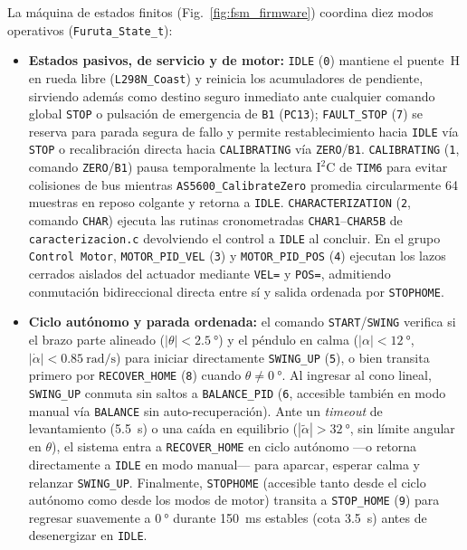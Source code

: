 La máquina de estados finitos (Fig.~\ref{fig:fsm_firmware}) coordina diez modos operativos (\texttt{Furuta\_State\_t}):
\begin{itemize}
    \item \textbf{Estados pasivos, de servicio y de motor:} \texttt{IDLE} (\texttt{0}) mantiene el puente~H en rueda libre (\texttt{L298N\_Coast}) y reinicia los acumuladores de pendiente, sirviendo además como destino seguro inmediato ante cualquier comando global \texttt{STOP} o pulsación de emergencia de \texttt{B1} (\texttt{PC13}); \texttt{FAULT\_STOP} (\texttt{7}) se reserva para parada segura de fallo y permite restablecimiento hacia \texttt{IDLE} vía \texttt{STOP} o recalibración directa hacia \texttt{CALIBRATING} vía \texttt{ZERO}/\texttt{B1}. \texttt{CALIBRATING} (\texttt{1}, comando \texttt{ZERO}/\texttt{B1}) pausa temporalmente la lectura $\text{I}^2\text{C}$ de \texttt{TIM6} para evitar colisiones de bus mientras \texttt{AS5600\_CalibrateZero} promedia circularmente 64 muestras en reposo colgante y retorna a \texttt{IDLE}. \texttt{CHARACTERIZATION} (\texttt{2}, comando \texttt{CHAR}) ejecuta las rutinas cronometradas \texttt{CHAR1}--\texttt{CHAR5B} de \texttt{caracterizacion.c} devolviendo el control a \texttt{IDLE} al concluir. En el grupo \texttt{Control Motor}, \texttt{MOTOR\_PID\_VEL} (\texttt{3}) y \texttt{MOTOR\_PID\_POS} (\texttt{4}) ejecutan los lazos cerrados aislados del actuador mediante \texttt{VEL=} y \texttt{POS=}, admitiendo conmutación bidireccional directa entre sí y salida ordenada por \texttt{STOPHOME}.
    \item \textbf{Ciclo autónomo y parada ordenada:} el comando \texttt{START}/\texttt{SWING} verifica si el brazo parte alineado ($|\theta|<\qty{2.5}{\degree}$) y el péndulo en calma ($|\alpha|<\qty{12}{\degree}$, $|\dot{\alpha}|<\qty{0.85}{\radian\per\second}$) para iniciar directamente \texttt{SWING\_UP} (\texttt{5}), o bien transita primero por \texttt{RECOVER\_HOME} (\texttt{8}) cuando $\theta\neq\qty{0}{\degree}$. Al ingresar al cono lineal, \texttt{SWING\_UP} conmuta sin saltos a \texttt{BALANCE\_PID} (\texttt{6}, accesible también en modo manual vía \texttt{BALANCE} sin auto-recuperación). Ante un \textit{timeout} de levantamiento (\qty{5.5}{\second}) o una caída en equilibrio ($|\tilde{\alpha}|>\qty{32}{\degree}$, sin límite angular en $\theta$), el sistema entra a \texttt{RECOVER\_HOME} en ciclo autónomo ---o retorna directamente a \texttt{IDLE} en modo manual--- para aparcar, esperar calma y relanzar \texttt{SWING\_UP}. Finalmente, \texttt{STOPHOME} (accesible tanto desde el ciclo autónomo como desde los modos de motor) transita a \texttt{STOP\_HOME} (\texttt{9}) para regresar suavemente a $\qty{0}{\degree}$ durante \qty{150}{\milli\second} estables (cota \qty{3.5}{\second}) antes de desenergizar en \texttt{IDLE}.
\end{itemize}

